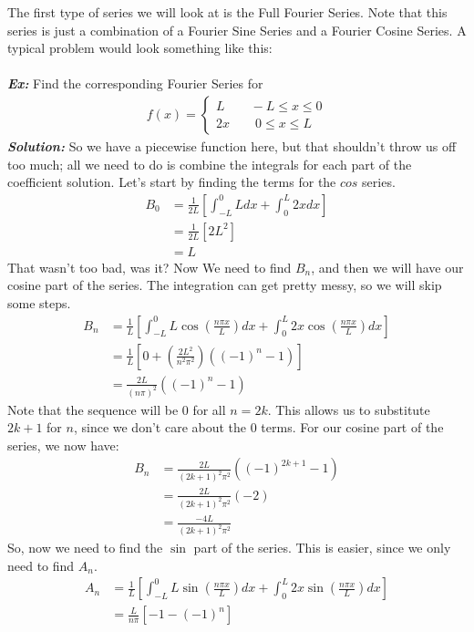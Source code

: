 \documentclass{article}
\begin{document}
\indent The first type of series we will look at is the Full Fourier Series. Note that this series is just a combination of a Fourier Sine Series and a Fourier Cosine Series. A typical problem would look something like this:\\\\
\textbf{\textit{Ex:}} Find the corresponding Fourier Series for
\begin{gather*}
f(x)=
\begin{cases*}
L \qquad -L \leq x \leq 0\\
2x \qquad 0 \leq x \leq L
\end{cases*}
\end{gather*}
\indent \textbf{\textit{Solution:}} So we have a piecewise function here, but that shouldn't throw us off too much; all we need to do is combine the integrals for each part of the coefficient solution. Let's start by finding the terms for the $cos$ series.
\begin{align*}
B_{0} &= \frac{1}{2L}\left[\int_{-L}^{0}Ldx + \int_{0}^{L}2xdx\right]\\
&= \frac{1}{2L}[2L^{2}]\\
&= L
\end{align*}
\noindent That wasn't too bad, was it? Now We need to find $B_{n}$, and then we will have our cosine part of the series. The integration can get pretty messy, so we will skip some steps.
\begin{align*}
B_{n} &= \frac{1}{L}\left[\int_{-L}^{0}L\cos{\left(\frac{n\pi x}{L}\right)}dx + \int_{0}^{L}2x\cos{\left(\frac{n\pi x}{L}\right)}dx\right]\\
&= \frac{1}{L}\left[0 + \left(\frac{2L^{2}}{n^{2}\pi^{2}}\right)((-1)^{n} - 1)\right]\\
&= \frac{2L}{(n\pi)^{2}}((-1)^{n} - 1)
\end{align*}
\noindent Note that the sequence will be 0 for all $n = 2k$. This allows us to substitute $2k+1$ for $n$, since we don't care about the $0$ terms. For our cosine part of the series, we now have:
\begin{align*}
B_{n} &= \frac{2L}{(2k+1)^{2}\pi^{2}}((-1)^{2k+1}-1)\\
&= \frac{2L}{(2k+1)^{2}\pi^{2}}(-2)\\
&= \frac{-4L}{(2k+1)^{2}\pi^{2}}
\end{align*}
\noindent So, now we need to find the $\sin$ part of the series. This is easier, since we only need to find $A_{n}$.
\begin{align*}
A_{n} &= \frac{1}{L}\left[\int_{-L}^{0}L\sin{\left(\frac{n\pi x}{L}\right)}dx + \int_{0}^{L}2x\sin{\left(\frac{n\pi x}{L}\right)}dx \right]\\
&= \frac{L}{n\pi}\left[-1-(-1)^{n}\right]
\end{align*}
\end{document}
